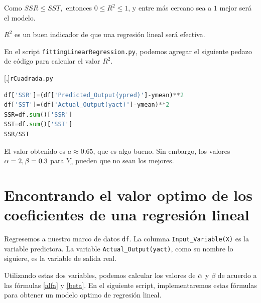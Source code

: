 Como $SSR\leq SST,$ entonces $0\leq R^{2} \leq 1$, y entre más cercano sea a $1$ mejor será el modelo.



$R^{2}$ es un buen indicador de que una regresión lineal será efectiva.


En el script \texttt{fittingLinearRegression.py}, podemos agregar el siguiente pedazo de código para calcular el valor $R^{2}$.

[,]{\texttt{rCuadrada.py}}
\begin{lstlisting}[language=Python]
df['SSR']=(df['Predicted_Output(ypred)']-ymean)**2
df['SST']=(df['Actual_Output(yact)']-ymean)**2
SSR=df.sum()['SSR']
SST=df.sum()['SST']
SSR/SST
\end{lstlisting}


El valor obtenido es $a\approx 0.65$, que es algo bueno. Sin embargo, los valores $\alpha=2, \beta=0.3$ para $Y_{e}$ pueden que no sean los mejores.

\section{Encontrando el valor optimo de los coeficientes de una regresión lineal}

Regresemos a nuestro marco de datos \texttt{df}. La columna \texttt{Input\_Variable(X)} es la variable predictora. 
La variable \texttt{Actual\_Output(yact)}, como su nombre lo siguiere, es la variable de salida real.


Utilizando estas dos variables, podemos calcular los valores de $\alpha$ y $\beta$ de acuerdo a las fórmulas \eqref{alfa} y \eqref{beta}.  En el siguiente script, implementaremos estas fórmulas para obtener un modelo optimo de regresión lineal.

